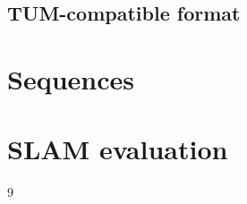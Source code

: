 \subsection{TUM-compatible format}

\section{Sequences}

\section{SLAM evaluation}

\begin{thebibliography}{9}


\end{thebibliography}

